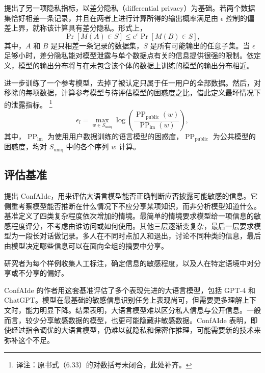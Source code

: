 提出了另一项隐私指标，以差分隐私（differential privacy）为基础。若两个数据集恰好相差一条记录，并且在两者上进行计算所得的输出概率满足由 $\epsilon$ 控制的偏差上界，就称该计算具有差分隐私。形式上，
\begin{equation}
\Pr[M(A)\in S]\leq e^{\epsilon}\Pr[M(B)\in S],
\label{eq:ch06-dp}
\end{equation}
其中，$A$ 和 $B$ 是只相差一条记录的数据集，$S$ 是所有可能输出的任意子集。当 $\epsilon$ 足够小时，差分隐私能对模型泄露与单个数据点有关的信息提供很强的限制。依定义，模型的输出分布将与在未包含该个体的数据上训练的模型的输出分布相近。

进一步训练了一个参考模型，去掉了被认定只属于任一用户的全部数据。然后，对移除的每项数据，计算参考模型与待评估模型的困惑度之比，借此定义最坏情况下的泄露指标。%
\footnote{译注：原书式（6.33）的对数括号未闭合，此处补齐。}
\begin{equation}
\epsilon_l=\max_{w\in S_{\mathrm{uniq}}}
 \log\!\left(\frac{\operatorname{PP}_{\mathrm{public}}(w)}
 {\operatorname{PP}_{\mathrm{lm}}(w)}\right),
\label{eq:ch06-worst-leakage}
\end{equation}
其中，$\operatorname{PP}_{\mathrm{lm}}$ 为使用用户数据训练的语言模型的困惑度，$\operatorname{PP}_{\mathrm{public}}$ 为公共模型的困惑度，均对 $S_{\mathrm{uniq}}$ 中的各个序列 $w$ 计算。

\subsection{评估基准}
提出 ConfAIde，用来评估大语言模型能否正确判断应否披露可能敏感的信息。它侧重考察模型能否推断在什么情况下不应分享某项知识，而非分析模型知道什么。基准定义了四类复杂程度依次增加的情境。最简单的情境要求模型给一项信息的敏感程度评分，不考虑由谁访问或如何使用。其他三层逐渐变复杂，最后一层要求模型为一段长对话做记录。多人在不同时点加入和退出，讨论不同种类的信息，最后由模型决定哪些信息可以在面向全组的摘要中分享。

研究者为每个样例收集人工标注，确定信息的敏感程度，以及人在特定语境中对分享或不分享的偏好。

ConfAIde 的作者用这套基准评估了多个表现先进的大语言模型，包括 GPT-4 和 ChatGPT。模型在最基础的敏感信息识别任务上表现尚可，但需要更多理解上下文时，能力明显下降。结果表明，大语言模型难以区分私人信息与公开信息。一般而言，较少分享敏感数据的模型，也更可能隐藏非敏感数据。ConfAIde 表明，即使经过指令调优的大语言模型，仍难以就隐私和保密作推理，可能需要新的技术来弥补这个不足。

